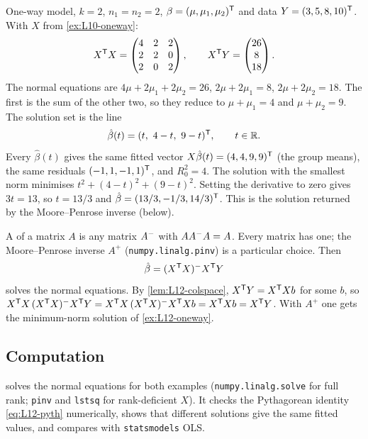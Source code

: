 \begin{example}\label{ex:L12-oneway}
One-way model, $k=2$, $n_1=n_2=2$, $\beta=(\mu,\mu_1,\mu_2)^{\mathsf T}$ and data $Y=(3,5,8,10)^{\mathsf T}$. With $X$ from
\cref{ex:L10-oneway}:
\[
X^{\mathsf T} X=\begin{pmatrix}4&2&2\\2&2&0\\2&0&2\end{pmatrix},\qquad X^{\mathsf T} Y=\begin{pmatrix}26\\8\\18\end{pmatrix}.
\]
The normal equations are $4\mu+2\mu_1+2\mu_2=26$, $2\mu+2\mu_1=8$, $2\mu+2\mu_2=18$. The first is the sum of the other
two, so they reduce to $\mu+\mu_1=4$ and $\mu+\mu_2=9$. The solution set is the line
\[
\hat\beta(t)=(t,\ 4-t,\ 9-t)^{\mathsf T},\qquad t\in\mathbb R .
\]
Every $\hat\beta(t)$ gives the same fitted vector $X\hat\beta(t)=(4,4,9,9)^{\mathsf T}$ (the group means), the same
residuals $(-1,1,-1,1)^{\mathsf T}$, and $R_0^2=4$. The solution with the smallest norm minimises
$t^2+(4-t)^2+(9-t)^2$. Setting the derivative to zero gives $3t=13$, so $t=13/3$ and
$\hat\beta=(13/3,-1/3,14/3)^{\mathsf T}$. This is the solution returned by the Moore--Penrose inverse (below).
\end{example}

\begin{note}
A  of a matrix $A$ is any matrix $A^{-}$ with $AA^{-}A=A$. Every matrix has one; the
Moore--Penrose inverse $A^{+}$ (\texttt{numpy.linalg.pinv}) is a particular choice. Then
\[
\hat\beta=(X^{\mathsf T} X)^{-}X^{\mathsf T} Y
\]
solves the normal equations. By \cref{lem:L12-colspace}, $X^{\mathsf T} Y=X^{\mathsf T} Xb$ for some $b$, so
$X^{\mathsf T} X\,(X^{\mathsf T} X)^{-}X^{\mathsf T} Y=X^{\mathsf T} X\,(X^{\mathsf T} X)^{-}X^{\mathsf T} Xb=X^{\mathsf T} Xb=X^{\mathsf T} Y$. With $A^{+}$ one gets the minimum-norm
solution of \cref{ex:L12-oneway}.
\end{note}

\subsection{Computation}
 solves the normal equations for both examples
(\texttt{numpy.linalg.solve} for full rank; \texttt{pinv} and \texttt{lstsq} for rank-deficient $X$). It
checks the Pythagorean identity \eqref{eq:L12-pyth} numerically, shows that different solutions give
the same fitted values, and compares with \texttt{statsmodels} OLS.

